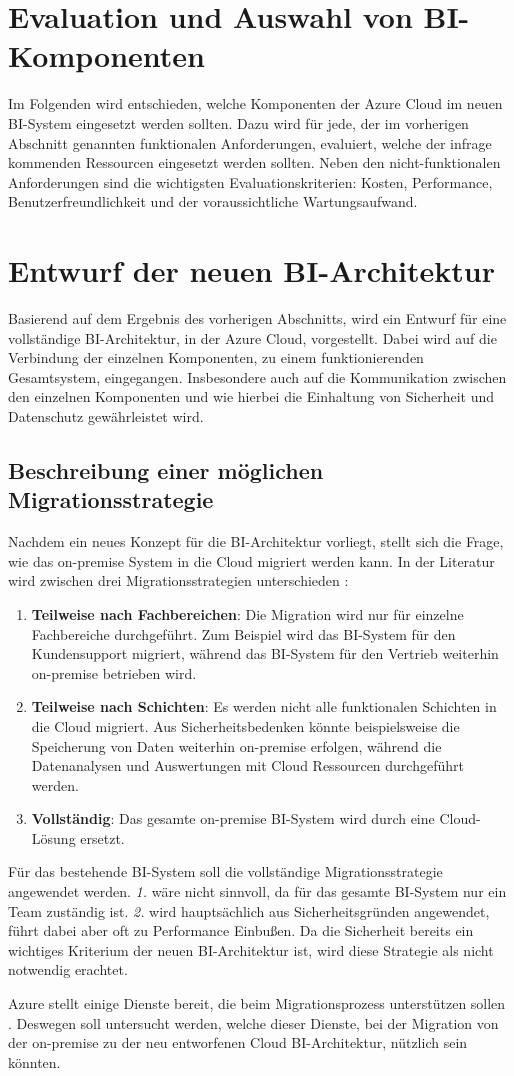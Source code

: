 \section{Evaluation und Auswahl von BI-Komponenten}
\label{sec:evaluationUndAuswahl}
Im Folgenden wird entschieden, welche Komponenten der Azure Cloud im neuen BI-System eingesetzt werden sollten. Dazu wird für jede, der im vorherigen Abschnitt genannten funktionalen Anforderungen, evaluiert, welche der infrage kommenden Ressourcen eingesetzt werden sollten. Neben den nicht-funktionalen Anforderungen sind die wichtigsten Evaluationskriterien: Kosten, Performance, Benutzerfreundlichkeit und der voraussichtliche Wartungsaufwand.

\section{Entwurf der neuen BI-Architektur}
\label{sec:entwurfBIArchitektur}
Basierend auf dem Ergebnis des vorherigen Abschnitts, wird ein Entwurf für eine vollständige BI-Architektur, in der Azure Cloud, vorgestellt. Dabei wird auf die Verbindung der einzelnen Komponenten, zu einem funktionierenden Gesamtsystem, eingegangen. Insbesondere auch auf die Kommunikation zwischen den einzelnen Komponenten und wie hierbei die Einhaltung von Sicherheit und Datenschutz gewährleistet wird.

\subsection{Beschreibung einer möglichen Migrationsstrategie}
\label{sec:beschreibungMigrationsstrategie}
Nachdem ein neues Konzept für die BI-Architektur vorliegt, stellt sich die Frage, wie das on-premise System in die Cloud migriert werden kann. In der Literatur wird zwischen drei Migrationsstrategien unterschieden \cite{juan-verdejo_moving_2014}:
\begin{enumerate}
\item \textbf{Teilweise nach Fachbereichen}: Die Migration wird nur für einzelne Fachbereiche durchgeführt. Zum Beispiel wird das BI-System für den Kundensupport migriert, während das BI-System für den Vertrieb weiterhin on-premise betrieben wird.
\item \textbf{Teilweise nach Schichten}: Es werden nicht alle funktionalen Schichten in die Cloud migriert. Aus Sicherheitsbedenken könnte beispielsweise die Speicherung von Daten weiterhin on-premise erfolgen, während die Datenanalysen und Auswertungen mit Cloud Ressourcen durchgeführt werden.
\item \textbf{Vollständig}: Das gesamte on-premise BI-System wird durch eine Cloud-Lösung ersetzt.
\end{enumerate}
Für das bestehende BI-System soll die vollständige Migrationsstrategie angewendet werden. \textit{1.} wäre nicht sinnvoll, da für das gesamte BI-System nur ein Team zuständig ist. \textit{2.} wird hauptsächlich aus Sicherheitsgründen angewendet, führt dabei aber oft zu Performance Einbußen. Da die Sicherheit bereits ein wichtiges Kriterium der neuen BI-Architektur ist, wird diese Strategie als nicht notwendig erachtet.

Azure stellt einige Dienste bereit, die beim Migrationsprozess unterstützen sollen \cite{chilberto_building_2020}. Deswegen soll untersucht werden, welche dieser Dienste, bei der Migration von der on-premise zu der neu entworfenen Cloud BI-Architektur, nützlich sein könnten.